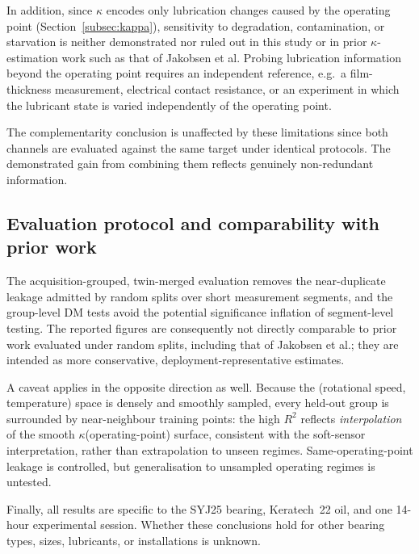 In addition, since $\kappa$ encodes only lubrication changes caused by the operating point (Section~\ref{subsec:kappa}), sensitivity to degradation, contamination, or starvation is neither demonstrated nor ruled out in this study or in prior $\kappa$-estimation work such as that of Jakobsen et al. Probing lubrication information beyond the operating point requires an independent reference, e.g.\ a film-thickness measurement, electrical contact resistance, or an experiment in which the lubricant state is varied independently of the operating point.

The complementarity conclusion is unaffected by these limitations since both channels are evaluated against the same target under identical protocols. The demonstrated gain from combining them reflects genuinely non-redundant information.

\subsection{Evaluation protocol and comparability with prior work}
\label{subsec:disc_protocol}

The acquisition-grouped, twin-merged evaluation removes the near-duplicate
leakage admitted by random splits over short measurement segments, and the
group-level DM tests avoid the potential significance inflation of segment-level testing. The reported figures are consequently not directly
comparable to prior work evaluated under random splits, including that of
Jakobsen et al.; they are intended as more conservative,
deployment-representative estimates.

A caveat applies in the opposite direction as well. Because the
(rotational speed, temperature) space is densely and smoothly sampled, every held-out group
is surrounded by near-neighbour training points: the high $R^2$ reflects
\emph{interpolation} of the smooth $\kappa$(operating-point) surface, consistent
with the soft-sensor interpretation, rather than extrapolation to unseen
regimes. Same-operating-point leakage is controlled, but generalisation to
unsampled operating regimes is untested.

Finally, all results are specific to the SYJ25 bearing, Keratech~22 oil, and one 14-hour experimental session. Whether these conclusions hold for other bearing types, sizes, lubricants, or installations is unknown.

